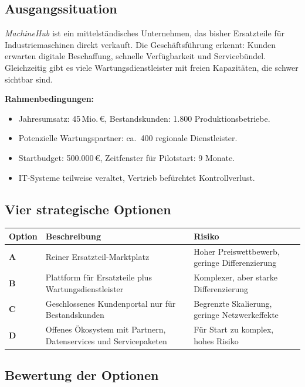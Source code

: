 \documentclass[11pt,a4paper,oneside]{article}
\begin{document}
\subsection{Ausgangssituation}

\emph{MachineHub} ist ein mittelständisches Unternehmen, das bisher Ersatzteile für Industriemaschinen direkt verkauft. Die Geschäftsführung erkennt: Kunden erwarten digitale Beschaffung, schnelle Verfügbarkeit und Servicebündel. Gleichzeitig gibt es viele Wartungsdienstleister mit freien Kapazitäten, die schwer sichtbar sind.

\textbf{Rahmenbedingungen:}
\begin{itemize}
  \item Jahresumsatz: 45\,Mio.\,\euro{}, Bestandskunden: 1.800 Produktionsbetriebe.
  \item Potenzielle Wartungspartner: ca.\ 400 regionale Dienstleister.
  \item Startbudget: 500.000\,\euro{}, Zeitfenster für Pilotstart: 9 Monate.
  \item IT-Systeme teilweise veraltet, Vertrieb befürchtet Kontrollverlust.
\end{itemize}

\subsection{Vier strategische Optionen}

\begin{tabularx}{\linewidth}{@{}>{\bfseries}lXl@{}}
\toprule
Option & Beschreibung & Risiko \\
\midrule
A & Reiner Ersatzteil-Marktplatz                                    & Hoher Preiswettbewerb, geringe Differenzierung \\
B & Plattform für Ersatzteile plus Wartungsdienstleister            & Komplexer, aber starke Differenzierung \\
C & Geschlossenes Kundenportal nur für Bestandskunden               & Begrenzte Skalierung, geringe Netzwerkeffekte \\
D & Offenes Ökosystem mit Partnern, Datenservices und Servicepaketen & Für Start zu komplex, hohes Risiko \\
\bottomrule
\end{tabularx}

\subsection{Bewertung der Optionen}
\end{document}
